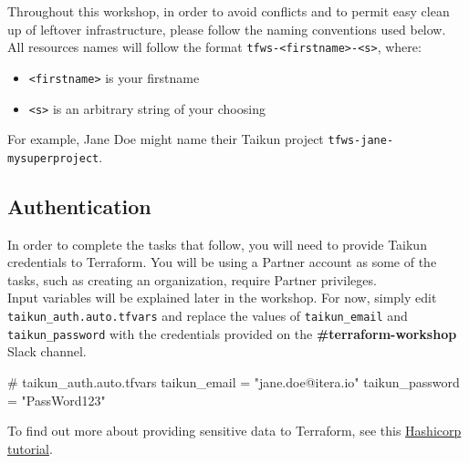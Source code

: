 \begin{warn}
  Throughout this workshop, in order to avoid conflicts and
  to permit easy clean up of leftover infrastructure, please follow the naming conventions used below.\\

  All resources names will follow the format \texttt{tfws-<firstname>-<s>}, where:
  \begin{itemize}
    \item \texttt{<firstname>} is your firstname
    \item \texttt{<s>} is an arbitrary string of your choosing
  \end{itemize}
  For example, Jane Doe might name their Taikun project \texttt{tfws-jane-mysuperproject}.
\end{warn}

\subsection{Authentication}\label{sec:auth}
In order to complete the tasks that follow, you will need to provide Taikun credentials to Terraform.
You will be using a Partner account as some of the tasks, such as creating an organization,
require Partner privileges.\\

Input variables will be explained later in the workshop.
For now, simply edit \texttt{taikun\_auth.auto.tfvars}
and replace the values of \texttt{taikun\_email} and \texttt{taikun\_password}
with the credentials provided on the \textbf{\#terraform-workshop} Slack channel.
\begin{tf}
# taikun_auth.auto.tfvars
taikun_email = "jane.doe@itera.io"
taikun_password = "PassWord123"
\end{tf}
To find out more about providing sensitive data to Terraform, see this \href{https://learn.hashicorp.com/tutorials/terraform/sensitive-variables}{Hashicorp tutorial}.
